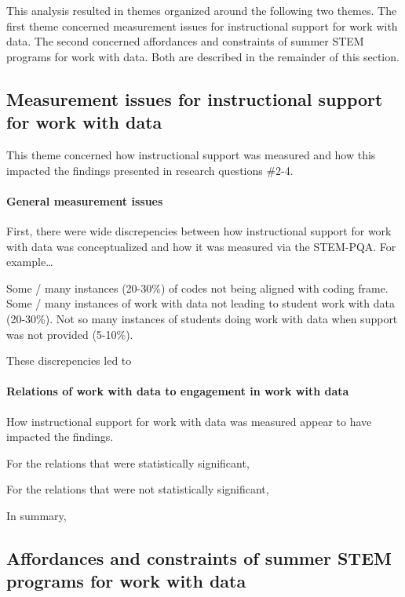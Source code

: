 \documentclass[]{msu-thesis}
\let\oldparagraph\paragraph
\renewcommand{\paragraph}[1]{\oldparagraph{#1}\mbox{}}
\theoremstyle{definition}
\theoremstyle{definition}
\theoremstyle{definition}
\theoremstyle{remark}
\begin{document}
This analysis resulted in themes organized around the following two
themes. The first theme concerned measurement issues for instructional
support for work with data. The second concerned affordances and
constraints of summer STEM programs for work with data. Both are
described in the remainder of this section.

\subsection{Measurement issues for instructional support for work with
data}\label{measurement-issues-for-instructional-support-for-work-with-data}

This theme concerned how instructional support was measured and how this
impacted the findings presented in research questions \#2-4.

\paragraph{General measurement issues}\label{general-measurement-issues}

First, there were wide discrepencies between how instructional support
for work with data was conceptualized and how it was measured via the
STEM-PQA. For example\ldots{}

Some / many instances (20-30\%) of codes not being aligned with coding
frame. Some / many instances of work with data not leading to student
work with data (20-30\%). Not so many instances of students doing work
with data when support was not provided (5-10\%).

These discrepencies led to

\paragraph{Relations of work with data to engagement in work with
data}\label{relations-of-work-with-data-to-engagement-in-work-with-data}

How instructional support for work with data was measured appear to have
impacted the findings.

For the relations that were statistically significant,

For the relations that were not statistically significant,

In summary,

\subsection{Affordances and constraints of summer STEM programs for work
with
data}\label{affordances-and-constraints-of-summer-stem-programs-for-work-with-data}
\end{document}
